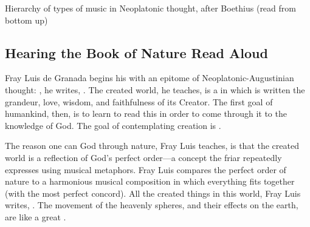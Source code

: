 
{Hierarchy of types of music in Neoplatonic thought, after Boethius (read from
bottom up)}

\subsection{Hearing the Book of Nature Read Aloud}

Fray Luis de Granada begins his  with an
epitome of Neoplatonic-Augustinian thought: , he writes, .%
    \Autocite[182]{LuisdeGranada:Simbolo}
The created world, he teaches, is a  in which is written
the grandeur, love, wisdom, and faithfulness of its Creator.
The first goal of humankind, then, is to learn to read this  in order to come through it to the knowledge of God. 
The goal of contemplating creation is .%
    \Autocite[184]{LuisdeGranada:Simbolo}


The reason one can  God through nature, Fray Luis teaches, is that
the created world is a reflection of God's perfect order---a concept the friar
repeatedly expresses using musical metaphors.
Fray Luis compares the perfect order of nature to a harmonious musical
composition in which everything fits together 
(with the most perfect concord).
All the created things in this world, Fray Luis writes, .%
    \Autocite[191]{LuisdeGranada:Simbolo}
The movement of the heavenly spheres, and their effects on the earth, are like
a great .%
    \Autocite[191]{LuisdeGranada:Simbolo}

